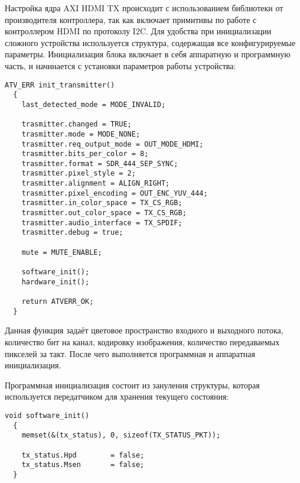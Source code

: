 Настройка ядра AXI HDMI TX происходит с использованием библиотеки от производителя контроллера,
так как включает примитивы по работе с контроллером HDMI по протоколу I2C.
Для удобства при инициализации сложного устройства используется структура, содержащая
все конфигурируемые параметры. Инициализация блока включает в себя аппаратную и программную часть, и
начинается с установки параметров работы устройства:
\medskip
\begin{lstlisting}[style=C]
  ATV_ERR init_transmitter()
  {
    last_detected_mode = MODE_INVALID;

    trasmitter.changed = TRUE;
    trasmitter.mode = MODE_NONE;
    trasmitter.req_output_mode = OUT_MODE_HDMI;
    trasmitter.bits_per_color = 8;
    trasmitter.format = SDR_444_SEP_SYNC;
    trasmitter.pixel_style = 2;
    trasmitter.alignment = ALIGN_RIGHT;
    trasmitter.pixel_encoding = OUT_ENC_YUV_444;
    trasmitter.in_color_space = TX_CS_RGB;
    trasmitter.out_color_space = TX_CS_RGB;
    trasmitter.audio_interface = TX_SPDIF;
    trasmitter.debug = true;

    mute = MUTE_ENABLE;

    software_init();
    hardware_init();

    return ATVERR_OK;
  }
\end{lstlisting}
\medskip

Данная функция задаёт цветовое пространство входного и выходного потока,
количество бит на канал, кодировку изображения, количество передаваемых
пикселей за такт. После чего выполняется программная и аппаратная инициализация.


Программная инициализация состоит из зануления структуры, которая используется
передатчиком для хранения текущего состояния:
\medskip
\begin{lstlisting}[style=C]
  void software_init()
  {
    memset(&(tx_status), 0, sizeof(TX_STATUS_PKT));

    tx_status.Hpd        = false;
    tx_status.Msen       = false;
  }
\end{lstlisting}
\medskip

